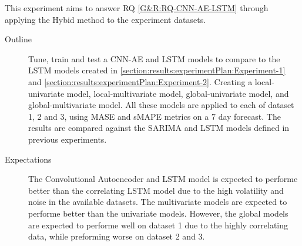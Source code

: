 This experiment aims to answer RQ \cref{G&R:RQ-CNN-AE-LSTM} through applying the Hybid method
to the experiment datasets.


\begin{description}
  \item[Outline]{
              Tune, train and test a CNN-AE and LSTM models to compare to the LSTM models
              created in \cref{section:results:experimentPlan:Experiment-1} and \cref{section:results:experimentPlan:Experiment-2}.
              Creating a local-univariate model, local-multivariate model, global-univariate model, and global-multivariate model.
              All these models are applied to each of dataset 1, 2 and 3, using MASE and sMAPE metrics on a 7 day forecast.
              The results are compared against the SARIMA and LSTM models defined in previous experiments.
        }
\end{description}

\begin{description}
  \item[Expectations]{
              The Convolutional Autoencoder and LSTM model is expected to performe better than the correlating LSTM model
              due to the high volatility and noise in the available datasets.
              The multivariate models are expected to performe better than the univariate models.
              However, the global models are expected to performe well on dataset 1 due to the highly correlating data,
              while preforming worse on dataset 2 and 3.
        }
\end{description}